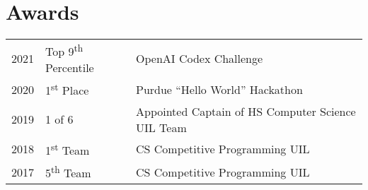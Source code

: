 \documentclass[letterpaper]{deedy-resume} %
\begin{document}
\begin{minipage}[t]{0.66\textwidth}




\sectionspace %







\section{Awards} 

\begin{tabular}{rll}
2021	 & Top 9\textsuperscript{th} Percentile & OpenAI Codex Challenge\\
2020	 & 1\textsuperscript{st} Place & Purdue ``Hello World'' Hackathon\\
2019	 & 1 of 6 & Appointed Captain of HS Computer Science UIL Team\\
2018	 & 1\textsuperscript{st} Team & CS Competitive Programming UIL \\
2017	 & 5\textsuperscript{th} Team & CS Competitive Programming UIL\\
\end{tabular}


\end{minipage}
\end{document}
